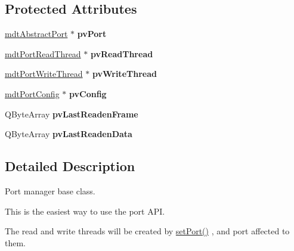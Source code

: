 \subsection*{Protected Attributes}
\begin{DoxyCompactItemize}
\item 
\hypertarget{classmdt_port_manager_af856162aab4f1c5202c1dfb330fae538}{
\hyperlink{classmdt_abstract_port}{mdtAbstractPort} $\ast$ {\bfseries pvPort}}
\label{classmdt_port_manager_af856162aab4f1c5202c1dfb330fae538}

\item 
\hypertarget{classmdt_port_manager_a00a4396199165f0e4bc7dab802e924e6}{
\hyperlink{classmdt_port_read_thread}{mdtPortReadThread} $\ast$ {\bfseries pvReadThread}}
\label{classmdt_port_manager_a00a4396199165f0e4bc7dab802e924e6}

\item 
\hypertarget{classmdt_port_manager_a21da115c51338357c50243742be8f814}{
\hyperlink{classmdt_port_write_thread}{mdtPortWriteThread} $\ast$ {\bfseries pvWriteThread}}
\label{classmdt_port_manager_a21da115c51338357c50243742be8f814}

\item 
\hypertarget{classmdt_port_manager_acca3074ae5bcc6fe64f0cd3f802b23d5}{
\hyperlink{classmdt_port_config}{mdtPortConfig} $\ast$ {\bfseries pvConfig}}
\label{classmdt_port_manager_acca3074ae5bcc6fe64f0cd3f802b23d5}

\item 
\hypertarget{classmdt_port_manager_adaa5de4e693944494c78fe9c7e8207d2}{
QByteArray {\bfseries pvLastReadenFrame}}
\label{classmdt_port_manager_adaa5de4e693944494c78fe9c7e8207d2}

\item 
\hypertarget{classmdt_port_manager_a27b171edec4e273e048593bbec7c37dc}{
QByteArray {\bfseries pvLastReadenData}}
\label{classmdt_port_manager_a27b171edec4e273e048593bbec7c37dc}

\end{DoxyCompactItemize}


\subsection{Detailed Description}
Port manager base class. 

This is the easiest way to use the port API.\par
 The read and write threads will be created by \hyperlink{classmdt_port_manager_afcd156b2d0c9d340999935efb6cd8cb6}{setPort()} , and port affected to them.\par


